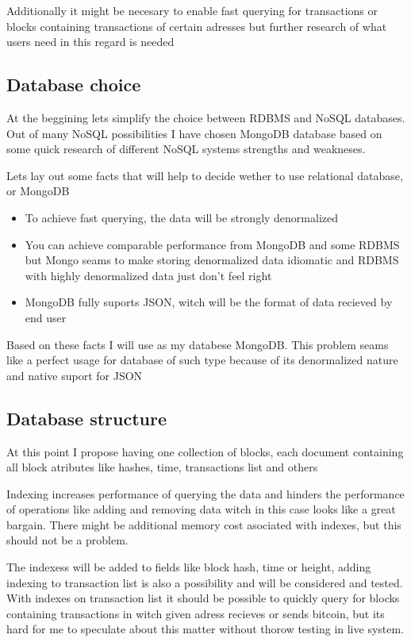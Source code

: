 \documentclass{article}
\begin{document}
Additionally it might be necesary to enable fast querying for transactions or blocks containing transactions of certain adresses but further research of what users need in this regard is needed

\subsection{Database choice}
At the beggining lets simplify the choice between RDBMS and NoSQL databases. Out of many NoSQL possibilities I have chosen MongoDB database based on some quick research of different NoSQL systems strengths and weakneses.

Lets lay out some facts that will help to decide wether to use relational database, or MongoDB

\begin{itemize}
\item 
To achieve fast querying, the data will be strongly denormalized
\item 
You can achieve comparable performance from MongoDB and some RDBMS but Mongo seams to make storing denormalized data idiomatic and RDBMS with highly denormalized data just don't feel right
\item MongoDB fully suports JSON, witch will be the format of data recieved by end user
\end{itemize}

Based on these facts I will use as my databese MongoDB. This problem seams like a perfect usage for database of such type because of its denormalized nature and native suport for JSON
 \subsection{Database structure}
 
 At this point I propose having one collection of blocks, each document containing all block atributes like hashes, time, transactions list and others
 
Indexing increases performance of querying the data and hinders the performance of operations like adding and removing data witch in this case looks like a great bargain. There might be additional memory cost asociated with indexes, but this should not be a problem.

The indexess will be added to fields like block hash, time or height, adding indexing to transaction list is also a possibility and will be considered and tested. With indexes on transaction list it should be possible to quickly query for blocks containing transactions in witch given adress recieves or sends bitcoin, but its hard for me to speculate about this matter without thorow testing in live system.
\end{document}
